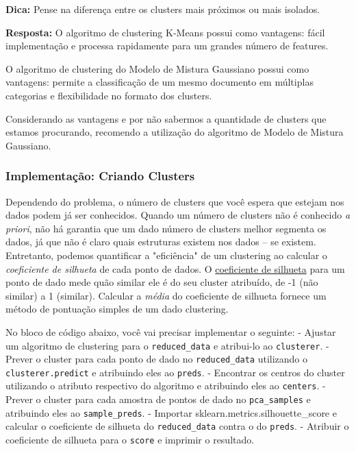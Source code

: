 \documentclass[11pt]{article}
\begin{document}
\textbf{Dica: }Pense na diferença entre os clusters mais próximos ou
mais isolados.

    \textbf{Resposta:} O algoritmo de clustering K-Means possui como
vantagens: fácil implementação e processa rapidamente para um grandes
número de features.

O algoritmo de clustering do Modelo de Mistura Gaussiano possui como
vantagens: permite a classificação de um mesmo documento em múltiplas
categorias e flexibilidade no formato dos clusters.

Considerando as vantagens e por não sabermos a quantidade de clusters
que estamos procurando, recomendo a utilização do algoritmo de Modelo de
Mistura Gaussiano.

    \subsubsection{Implementação: Criando
Clusters}\label{implementauxe7uxe3o-criando-clusters}

Dependendo do problema, o número de clusters que você espera que estejam
nos dados podem já ser conhecidos. Quando um número de clusters não é
conhecido \emph{a priori}, não há garantia que um dado número de
clusters melhor segmenta os dados, já que não é claro quais estruturas
existem nos dados -- se existem. Entretanto, podemos quantificar a
"eficiência" de um clustering ao calcular o \emph{coeficiente de
silhueta} de cada ponto de dados. O
\href{http://scikit-learn.org/stable/modules/generated/sklearn.metrics.silhouette_score.html}{coeficiente
de silhueta} para um ponto de dado mede quão similar ele é do seu
cluster atribuído, de -1 (não similar) a 1 (similar). Calcular a
\emph{média} do coeficiente de silhueta fornece um método de pontuação
simples de um dado clustering.

No bloco de código abaixo, você vai precisar implementar o seguinte: -
Ajustar um algoritmo de clustering para o \texttt{reduced\_data} e
atribui-lo ao \texttt{clusterer}. - Prever o cluster para cada ponto de
dado no \texttt{reduced\_data} utilizando o \texttt{clusterer.predict} e
atribuindo eles ao \texttt{preds}. - Encontrar os centros do cluster
utilizando o atributo respectivo do algoritmo e atribuindo eles ao
\texttt{centers}. - Prever o cluster para cada amostra de pontos de dado
no \texttt{pca\_samples} e atribuindo eles ao \texttt{sample\_preds}. -
Importar sklearn.metrics.silhouette\_score e calcular o coeficiente de
silhueta do \texttt{reduced\_data} contra o do \texttt{preds}. -
Atribuir o coeficiente de silhueta para o \texttt{score} e imprimir o
resultado.
\end{document}
